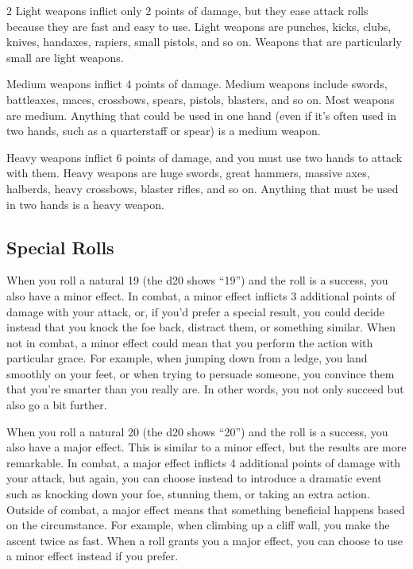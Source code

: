 \begin{multicols}{2}
Light weapons inflict only 2 points of damage, but they ease attack rolls because they are fast and easy to use. Light weapons are punches, kicks, clubs, knives, handaxes, rapiers, small pistols, and so on. Weapons that are particularly small are light weapons.

Medium weapons inflict 4 points of damage. Medium weapons include swords, battleaxes, maces, crossbows, spears, pistols, blasters, and so on. Most weapons are medium. Anything that could be used in one hand (even if it’s often used in two hands, such as a quarterstaff or spear) is a medium weapon.

Heavy weapons inflict 6 points of damage, and you must use two hands to attack with them. Heavy weapons are huge swords, great hammers, massive axes, halberds, heavy crossbows, blaster rifles, and so on. Anything that must be used in two hands is a heavy weapon.

\subsection{Special Rolls}

When you roll a natural 19 (the d20 shows “19”) and the roll is a success, you also have a minor effect. In combat, a minor effect inflicts 3 additional points of damage with your attack, or, if you’d prefer a special result, you could decide instead that you knock the foe back, distract them, or something similar. When not in combat, a minor effect could mean that you perform the action with particular grace. For example, when jumping down from a ledge, you land smoothly on your feet, or when trying to persuade someone, you convince them that you’re smarter than you really are. In other words, you not only succeed but also go a bit further.

When you roll a natural 20 (the d20 shows “20”) and the roll is a success, you also have a major effect. This is similar to a minor effect, but the results are more remarkable. In combat, a major effect inflicts 4 additional points of damage with your attack, but again, you can choose instead to introduce a dramatic event such as knocking down your foe, stunning them, or taking an extra action. Outside of combat, a major effect means that something beneficial happens based on the circumstance. For example, when climbing up a cliff wall, you make the ascent twice as fast. When a roll grants you a major effect, you can choose to use a minor effect instead if you prefer.


\end{multicols}
